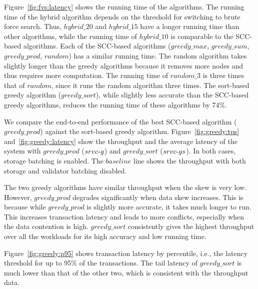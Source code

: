 Figure~\ref{fig:fvs:latency} shows the running time of the algorithms. The running time of the hybrid algorithm depends on the threshold for switching to brute force search. Thus, $hybrid\_20$ and $hybrid\_15$ have a longer running time than other algorithms, while the running time of $hybrid\_10$ is comparable to the SCC-based algorithms. Each of the SCC-based algorithms ($greedy\_max$, $greedy\_sum$, $greedy\_prod$, $random$) has a similar running time. The random algorithm takes slightly longer than the greedy algorithms because it removes more nodes and thus requires more computation. The running time of $random\_3$ is three times that of $random$, since it runs the random algorithm three times. The sort-based greedy algorithm ($greedy\_sort$), while slightly less accurate than the SCC-based greedy algorithms, reduces the running time of these algorithms by 74\%. 

We compare the end-to-end performance of the best SCC-based algorithm ($greedy\_prod$) against the sort-based greedy algorithm. Figure~\ref{fig:greedy:tps} and~\ref{fig:greedy:latency} show the  throughput and the average latency of the system with $greedy\_prod$ ($srvc\hbox{-}g$) and $greedy\_sort$ ($srvc\hbox{-}gs$). In both cases, storage batching is enabled. The $baseline$ line shows the throughput with both storage and validator batching disabled. 

The two greedy algorithms have similar throughput when the skew is very low. However, $greedy\_prod$ degrades significantly when data skew increases. This is because while $greedy\_prod$ is slightly more accurate, it takes much longer to run. This increases transaction latency and leads to more conflicts, especially when the data contention is high. $greedy\_sort$ consistently gives the highest throughput over all the workloads for its high accuracy and low running time. 

Figure~\ref{fig:greedy:p95} shows transaction latency by percentile, i.e., the latency threshold for up to 95\% of the transactions. The tail latency of $greedy\_sort$ is much lower than that of the other two, which is consistent with the throughput data.

